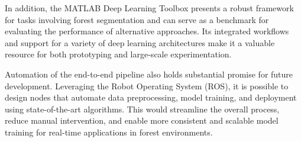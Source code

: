 \documentclass[../report.tex]{subfiles}
\begin{document}
    In addition, the MATLAB Deep Learning Toolbox presents a robust framework for tasks involving forest segmentation and can serve as a benchmark for evaluating the performance of alternative approaches. Its integrated workflows and support for a variety of deep learning architectures make it a valuable resource for both prototyping and large-scale experimentation.
    
    Automation of the end-to-end pipeline also holds substantial promise for future development. Leveraging the Robot Operating System (ROS), it is possible to design nodes that automate data preprocessing, model training, and deployment using state-of-the-art algorithms. This would streamline the overall process, reduce manual intervention, and enable more consistent and scalable model training for real-time applications in forest environments.
\end{document}

